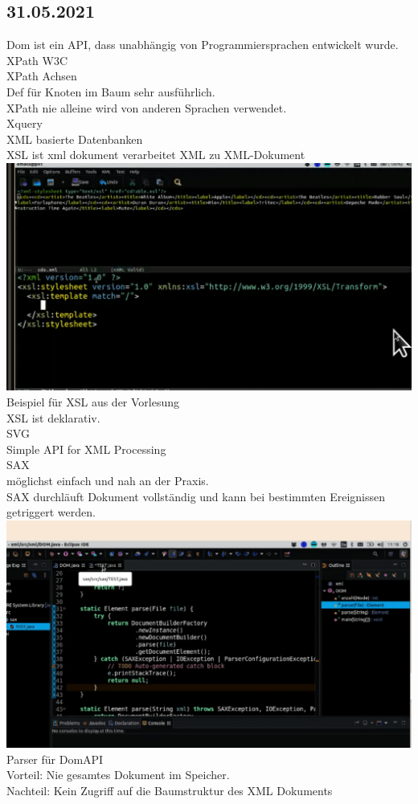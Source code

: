 \documentclass[paper=A4]{article}
\begin{document}
	\subsection*{31.05.2021}
	Dom ist ein API, dass unabhängig von Programmiersprachen entwickelt wurde. \\
	XPath W3C \\
	XPath Achsen \\
 	Def für Knoten im Baum sehr ausführlich. \\
 	XPath nie alleine wird von anderen Sprachen verwendet. \\
 	Xquery 	 \\
 	XML basierte Datenbanken \\
 	XSL ist xml dokument verarbeitet XML zu XML-Dokument \\
 	\includegraphics[width=\linewidth]{xslsample} \\
 	Beispiel für XSL aus der Vorlesung \\
 	XSL ist deklarativ. \\
 	SVG \\
 	Simple API for XML Processing \\
 	SAX \\
 	möglichst einfach und nah an der Praxis. \\
 	SAX durchläuft Dokument vollständig und kann bei bestimmten Ereignissen getriggert werden. \\
 	\includegraphics[width=\linewidth]{domparser}
 	Parser für DomAPI \\
 	Vorteil: Nie gesamtes Dokument im Speicher. \\
 	Nachteil: Kein Zugriff auf die Baumstruktur des XML Dokuments \\
\end{document}
